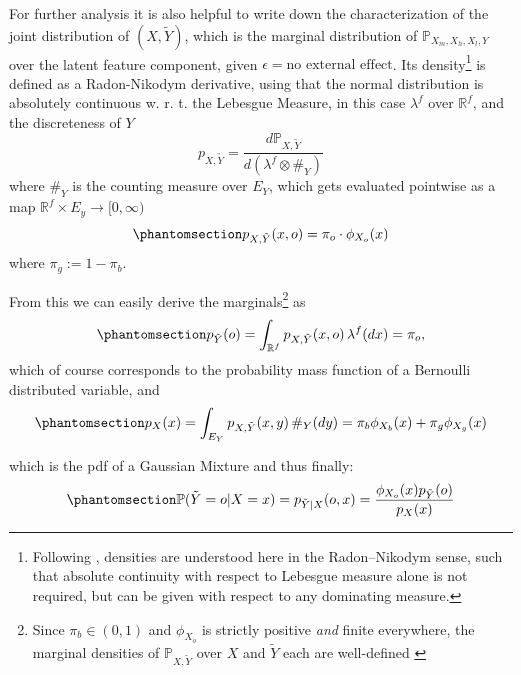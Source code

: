 \documentclass[
  12pt,
]{article}
\begin{document}
For further analysis it is also helpful to write down the
characterization of the joint distribution of \((X,\tilde{Y})\), which
is the marginal distribution of \(\mathbb{P}_{X_m, X_h, X_l, Y}\) over
the latent feature component, given
\(\epsilon = \text{no external effect}\). Its density\footnote{
  Following \textcite[Ch. 3, Sec. 1]{Pollard_2001}, densities are
  understood here in the Radon--Nikodym sense, such that absolute
  continuity with respect to Lebesgue measure alone is not required, but
  can be given with respect to any dominating measure.} is defined as a
Radon-Nikodym derivative, using that the normal distribution is
absolutely continuous w. r. t. the Lebesgue Measure, in this case
\(\lambda^f\) over \(\mathbb{R}^f\), and the discreteness of \(Y\) \[
p_{X, \tilde{Y}} = \frac{d\mathbb{P}_{X, \tilde{Y}}}{d\left(\lambda^f \otimes \#_Y\right)}
\] where \(\#_Y\) is the counting measure over \(E_Y\), which gets
evaluated pointwise as a map \(\mathbb{R}^f \times E_y \to [0, \infty)\)
\begin{equation}\protect\phantomsection\label{eq-join-density-x-tilde-y}{
p_{X, \tilde{Y}}(x, o) = \pi_o \cdot \phi_{X_o}(x)
}\end{equation} where \(\pi_g := 1 - \pi_b\).

From this we can easily derive the marginals\footnote{ Since
  \(\pi_b \in (0, 1)\) and \(\phi_{X_o}\) is strictly positive
  \emph{and} finite everywhere, the marginal densities of
  \(\mathbb{P}_{X, \tilde{Y}}\) over \(X\) and \(\tilde{Y}\) each are
  well-defined \autocite[Ch. 4, Theorem 12]{Pollard_2001}} as
\begin{equation}\protect\phantomsection\label{eq-marginal-of-Y}{
p_{\tilde{Y}}(o) = \int_{\mathbb{R}^{f}} p_{X, \tilde{Y}}(x, o) \, \lambda^f(dx) = \pi_o ,
}\end{equation} which of course corresponds to the probability mass
function of a Bernoulli distributed variable, and
\begin{equation}\protect\phantomsection\label{eq-marginal-of-X}{
p_X(x) = \int_{E_Y} p_{X, \tilde{Y}}(x, y) \, \#_{Y}(dy) = \pi_b \phi_{X_b}(x) + \pi_g \phi_{X_g}(x)
}\end{equation}

which is the pdf of a Gaussian Mixture and thus finally:
\begin{equation}\protect\phantomsection\label{eq-posterior-of-Y}{
\mathbb{P}(\tilde{Y} = o | X=x) = p_{\tilde{Y} | X} (o, x) = \frac{\phi_{X_o}(x) p_{\tilde{Y}}(o)}{p_X(x)}
}\end{equation}
\end{document}

